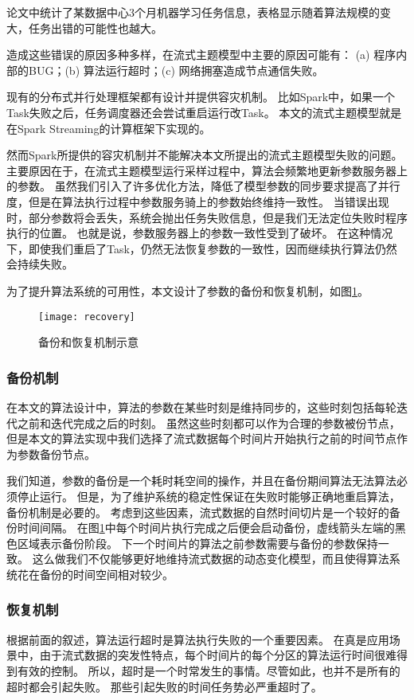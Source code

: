 论文\cite{li2014scaling}中统计了某数据中心3个月机器学习任务信息，表格显示随着算法规模的变大，任务出错的可能性也越大。

造成这些错误的原因多种多样，在流式主题模型中主要的原因可能有：
(a) 程序内部的BUG；(b) 算法运行超时；(c) 网络拥塞造成节点通信失败。

现有的分布式并行处理框架都有设计并提供容灾机制。
比如Spark中，如果一个Task失败之后，任务调度器还会尝试重启运行改Task。
本文的流式主题模型就是在Spark Streaming的计算框架下实现的。

然而Spark所提供的容灾机制并不能解决本文所提出的流式主题模型失败的问题。
主要原因在于，在流式主题模型运行采样过程中，算法会频繁地更新参数服务器上的参数。
虽然我们引入了许多优化方法，降低了模型参数的同步要求提高了并行度，但是在算法执行过程中参数服务骑上的参数始终维持一致性。
当错误出现时，部分参数将会丢失，系统会抛出任务失败信息，但是我们无法定位失败时程序执行的位置。
也就是说，参数服务器上的参数一致性受到了破坏。
在这种情况下，即使我们重启了Task，仍然无法恢复参数的一致性，因而继续执行算法仍然会持续失败。

为了提升算法系统的可用性，本文设计了参数的备份和恢复机制，如图\ref{fig:recovery}。
\begin{figure}[htb]\centering
\texttt{[image: recovery]}
\caption{备份和恢复机制示意}
\label{fig:recovery}%
\end{figure}

\subsubsection{备份机制}
在本文的算法设计中，算法的参数在某些时刻是维持同步的，这些时刻包括每轮迭代之前和迭代完成之后的时刻。
虽然这些时刻都可以作为合理的参数被份节点，但是本文的算法实现中我们选择了流式数据每个时间片开始执行之前的时间节点作为参数备份节点。

我们知道，参数的备份是一个耗时耗空间的操作，并且在备份期间算法无法算法必须停止运行。
但是，为了维护系统的稳定性保证在失败时能够正确地重启算法，备份机制是必要的。
考虑到这些因素，流式数据的自然时间切片是一个较好的备份时间间隔。
在图\ref{fig:recovery}中每个时间片执行完成之后便会启动备份，虚线箭头左端的黑色区域表示备份阶段。
下一个时间片的算法之前参数需要与备份的参数保持一致。
这么做我们不仅能够更好地维持流式数据的动态变化模型，而且使得算法系统花在备份的时间空间相对较少。

\subsubsection{恢复机制}
根据前面的叙述，算法运行超时是算法执行失败的一个重要因素。
在真是应用场景中，由于流式数据的突发性特点，每个时间片的每个分区的算法运行时间很难得到有效的控制。
所以，超时是一个时常发生的事情。尽管如此，也并不是所有的超时都会引起失败。
那些引起失败的时间任务势必严重超时了。

